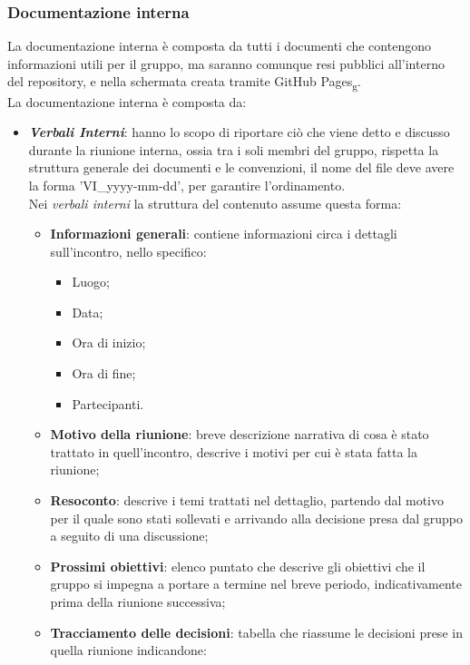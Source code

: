         \subsubsection{Documentazione interna}
        La documentazione interna è composta da tutti i documenti che contengono informazioni utili per il gruppo,  
        ma saranno comunque resi pubblici all'interno del repository, e nella schermata creata tramite GitHub Pages\textsubscript{g}.\\
        La documentazione interna è composta da:
        \begin{itemize}
            \item \textit{\textbf{Verbali Interni}}: hanno lo scopo di riportare ciò che viene detto e discusso durante la riunione interna, ossia tra i soli membri del gruppo, 
            rispetta la struttura generale dei documenti e le convenzioni, il nome del file deve avere la forma 'VI\_yyyy-mm-dd', per garantire l'ordinamento.
            \\Nei \textit{verbali interni} la struttura del contenuto assume questa forma:
            \begin{itemize}
                \item \textbf{Informazioni generali}: contiene informazioni circa i dettagli sull'incontro, nello specifico:
                \begin{itemize}
                    \item Luogo;
                    \item Data;
                    \item Ora di inizio;
                    \item Ora di fine;
                    \item Partecipanti.
                \end{itemize}
                \item \textbf{Motivo della riunione}: breve descrizione narrativa di cosa è stato trattato in quell'incontro, descrive i motivi per cui è stata fatta la riunione;
                \item \textbf{Resoconto}: descrive i temi trattati nel dettaglio, partendo dal motivo per il quale sono stati sollevati e arrivando alla decisione presa dal gruppo a seguito di una discussione;
                \item \textbf{Prossimi obiettivi}: elenco puntato che descrive gli obiettivi che il gruppo si impegna a portare a termine nel breve periodo, indicativamente prima della riunione successiva;
                \item \textbf{Tracciamento delle decisioni}: tabella che riassume le decisioni prese in quella riunione indicandone:

\end{itemize}
\end{itemize}
